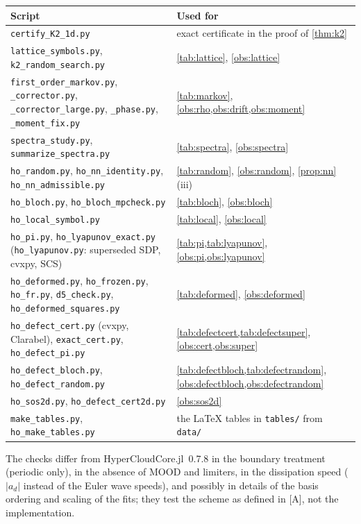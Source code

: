 \documentclass[11pt,a4paper]{article}
\theoremstyle{plain}
\theoremstyle{definition}
\theoremstyle{remark}
\numberwithin{equation}{section}
\begin{document}
\begin{center}
\small
\begin{tabular}{>{\raggedright}p{6.2cm}>{\raggedright\arraybackslash}p{8.2cm}}
\toprule
Script & Used for\\
\midrule
\texttt{certify\_K2\_1d.py} & exact certificate in the proof of \cref{thm:k2}\\
\texttt{lattice\_symbols.py}, \texttt{k2\_random\_search.py} & \cref{tab:lattice}, \cref{obs:lattice}\\
\texttt{first\_order\_markov.py}, \texttt{\_corrector.py}, \texttt{\_corrector\_large.py}, \texttt{\_phase.py}, \texttt{\_moment\_fix.py} & \cref{tab:markov}, \cref{obs:rho,obs:drift,obs:moment}\\
\texttt{spectra\_study.py}, \texttt{summarize\_spectra.py} & \cref{tab:spectra}, \cref{obs:spectra}\\
\texttt{ho\_random.py}, \texttt{ho\_nn\_identity.py}, \texttt{ho\_nn\_admissible.py} & \cref{tab:random}, \cref{obs:random}, \cref{prop:nn}(iii)\\
\texttt{ho\_bloch.py}, \texttt{ho\_bloch\_mpcheck.py} & \cref{tab:bloch}, \cref{obs:bloch}\\
\texttt{ho\_local\_symbol.py} & \cref{tab:local}, \cref{obs:local}\\
\texttt{ho\_pi.py}, \texttt{ho\_lyapunov\_exact.py} (\texttt{ho\_lyapunov.py}: superseded SDP, cvxpy, SCS) & \cref{tab:pi,tab:lyapunov}, \cref{obs:pi,obs:lyapunov}\\
\texttt{ho\_deformed.py}, \texttt{ho\_frozen.py}, \texttt{ho\_fr.py}, \texttt{d5\_check.py}, \texttt{ho\_deformed\_squares.py} & \cref{tab:deformed}, \cref{obs:deformed}\\
\texttt{ho\_defect\_cert.py} (cvxpy, Clarabel), \texttt{exact\_cert.py}, \texttt{ho\_defect\_pi.py} & \cref{tab:defectcert,tab:defectsuper}, \cref{obs:cert,obs:super}\\
\texttt{ho\_defect\_bloch.py}, \texttt{ho\_defect\_random.py} & \cref{tab:defectbloch,tab:defectrandom}, \cref{obs:defectbloch,obs:defectrandom}\\
\texttt{ho\_sos2d.py}, \texttt{ho\_defect\_cert2d.py} & \cref{obs:sos2d}\\
\texttt{make\_tables.py}, \texttt{ho\_make\_tables.py} & the \LaTeX{} tables in \texttt{tables/} from \texttt{data/}\\
\bottomrule
\end{tabular}
\end{center}

The checks differ from HyperCloudCore.jl~0.7.8 in the boundary treatment (periodic only), in the absence of MOOD and limiters, in the dissipation speed ($|a_d|$ instead of the Euler wave speeds), and possibly in details of the basis ordering and scaling of the fits; they test the scheme as defined in [A], not the implementation.
\end{document}
